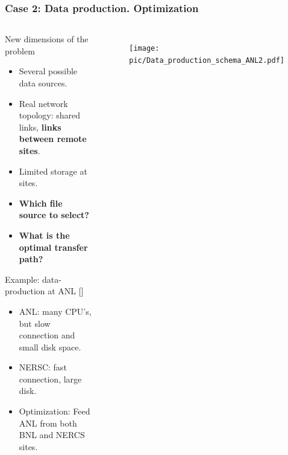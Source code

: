 \documentclass{beamer}
\begin{document}
\begin{frame}\frametitle{Case 2: Data production. Optimization }
 	\begin{columns}[c] %
    \begin{footnotesize}
    \vspace{-20mm}
	\begin{block}{New dimensions of the problem}	
		\begin{itemize}		
			\item Several possible data sources.
			\item Real network topology: shared links, \textbf{links between remote sites}.
			\item Limited storage at sites.
			\item \textbf{Which file source to select?}
			\item \textbf{What is the optimal transfer path?}

		\end{itemize}
 	\end{block}
		\begin{block}{Example: data-production at ANL  \textcolor{black}{[\cite{Balewski}]}}	
		\begin{itemize}
			\item ANL: many CPU's, but slow connection and small disk space.
			\item NERSC: fast connection, large disk.
			\item Optimization: Feed ANL from both BNL and NERCS sites.		

		\end{itemize}
 	\end{block}
 	\end{footnotesize} 
		\begin{figure}
			\begin{center}
			    \vspace{-15mm}
				\texttt{[image: pic/Data\_production\_schema\_ANL2.pdf]}
			\end{center}
			\end{figure} 	 	
 	\end{columns}
\end{frame}
\end{document}
